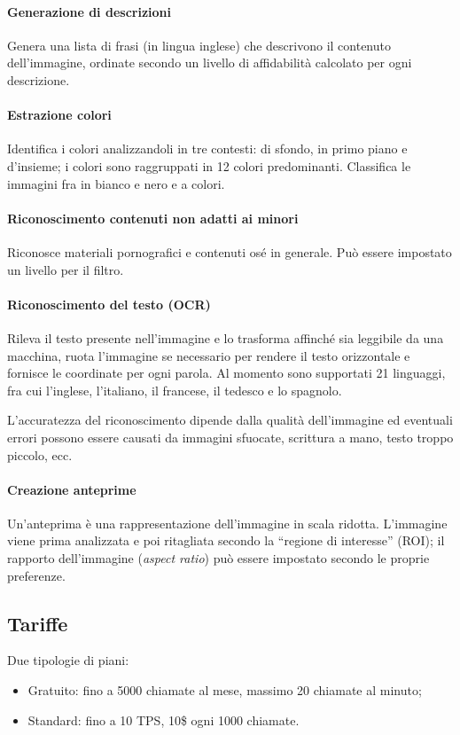 \documentclass[fleqn,a4paper,11pt]{report}
\begin{document}
\paragraph{Generazione di descrizioni} Genera una lista di frasi (in lingua inglese) che descrivono il contenuto dell'immagine, ordinate secondo un livello di affidabilità calcolato per ogni descrizione.

\paragraph{Estrazione colori} Identifica i colori analizzandoli in tre contesti: di sfondo, in primo piano e d'insieme; i colori sono raggruppati in 12 colori predominanti. Classifica le immagini fra in bianco e nero e a colori.

\paragraph{Riconoscimento contenuti non adatti ai minori} Riconosce materiali pornografici e contenuti osé in generale. Può essere impostato un livello per il filtro.

\paragraph{Riconoscimento del testo (OCR)} Rileva il testo presente nell'immagine e lo trasforma affinché sia leggibile da una macchina, ruota l'immagine se necessario per rendere il testo orizzontale e fornisce le coordinate per ogni parola. Al momento sono supportati 21 linguaggi, fra cui l'inglese, l'italiano, il francese, il tedesco e lo spagnolo.

L'accuratezza del riconoscimento dipende dalla qualità dell'immagine ed eventuali errori possono essere causati da immagini sfuocate, scrittura a mano, testo troppo piccolo, ecc.
   
\paragraph{Creazione anteprime} Un'anteprima è una rappresentazione dell'immagine in scala ridotta. L'immagine viene prima analizzata e poi ritagliata secondo la ``regione di interesse'' (ROI); il rapporto dell'immagine (\textit{aspect ratio}) può essere impostato secondo le proprie preferenze.


\subsection{Tariffe} Due tipologie di piani:
\begin{itemize}
\item Gratuito: fino a 5000 chiamate al mese, massimo 20 chiamate al minuto;
\item Standard: fino a 10 TPS, 10\$ ogni 1000 chiamate. 
\end{itemize}
\end{document}
